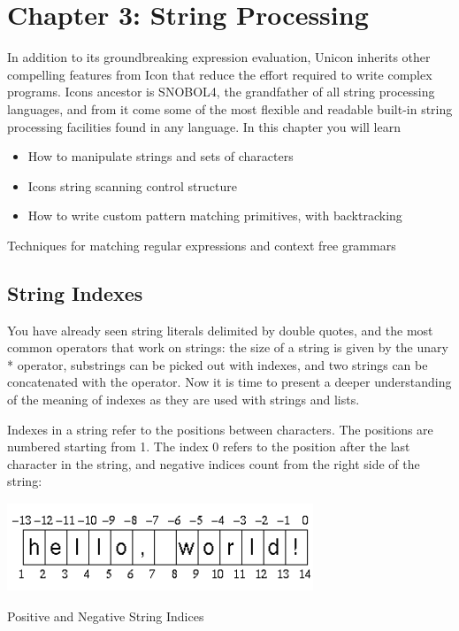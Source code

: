 \clearpage\section{Chapter 3: String Processing}
In addition to its groundbreaking expression evaluation, Unicon inherits
other compelling features from Icon that reduce the effort required to
write complex programs. Icon{\textquotesingle}s ancestor is
SNOBOL4, the grandfather of all string processing
languages, and from it come some of the most flexible and readable
built-in string processing facilities found in any language. In this
chapter you will learn

\begin{itemize}
\item How to manipulate strings and sets of characters
\item Icon{\textquotesingle}s string scanning control structure
\item How to write custom pattern matching
primitives, with backtracking
\end{itemize}
Techniques for matching regular expressions and context free grammars

\subsection{String Indexes}
You have already seen string literals delimited by double quotes, and
the most common operators that work on strings: the size of a string is
given by the unary \textsf{*} operator, substrings can be picked out
with indexes, and two strings can be concatenated with the
\textsf{{\textbar}{\textbar}} operator. Now it is time to present a
deeper understanding of the meaning of indexes as they are used with
strings and lists.

Indexes in a string refer to the positions
between characters. The positions are numbered starting from 1. The
index 0 refers to the position after the last character in the string,
and negative indices count from the right side of the string:


\begin{center}
\includegraphics[width=3.6075in,height=1.0417in]{ub-img/ub-img7.png}
\end{center}
\vspace{-0.25cm}{\sffamily\bfseries Figure 3-1:}
{\sffamily Positive and Negative String Indices}

